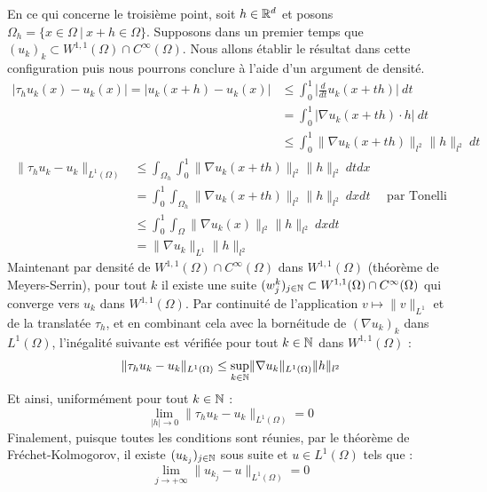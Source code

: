 En ce qui concerne le troisième point, soit $h\in \mathbb{R}^d$ et posons $\Omega_h = \big\{ x \in \Omega \ | \ x + h \in \Omega \big\}$.
Supposons dans un premier temps que $(u_k)_k \subset W^{1,1}(\Omega) \cap C^{\infty}(\Omega)$. Nous allons établir le résultat dans cette configuration puis nous pourrons conclure à l'aide d'un argument de densité.
\begin{equation*}
\begin{split}
    |\tau_h u_k(x) - u_k(x)| = |u_k(x+h) - u_k(x)| &\leq \int_{0}^{1} \Big| \frac{d}{dt}u_k(x+th) \Big| \ dt \\
    &= \int_{0}^{1} \big| \nabla u_k(x+th) \cdot h \big| \ dt \\
    &\leq \int_{0}^{1} \|\nabla u_k(x + th)\|_{l^2}\|h\|_{l^2} \ dt
\end{split}
\end{equation*}
\begin{equation*}
\begin{split}
    \| \tau_h u_k - u_k \|_{L^1(\Omega)} &\leq \int_{\Omega_h} \int_{0}^{1} \|\nabla u_k(x + th)\|_{l^2}\|h\|_{l^2}  \ dt dx \\
    &= \int_{0}^{1} \int_{\Omega_h} \|\nabla u_k(x + th)\|_{l^2}\|h\|_{l^2}  \ dx dt \quad \text{ par Tonelli} \\
    &\leq \int_{0}^{1} \int_{\Omega} \| \nabla u_k(x) \|_{l^2} \|h\|_{l^2} \ dx dt \\
    &= \| \nabla u_k \|_{L^1} \|h\|_{l^2}
\end{split}
\end{equation*}
Maintenant par densité de $W^{1,1}(\Omega) \cap C^{\infty}(\Omega)$ dans $W^{1,1}(\Omega)$ (théorème de Meyers-Serrin), pour tout $k$ il existe une suite $(w^k_j)_{j \in \mathbb{N}} \subset W^{1,1}(\Omega)\cap C^{\infty}(\Omega)$ qui converge vers $u_k$ dans $W^{1,1}(\Omega)$.
Par continuité de l'application $v \mapsto \| v \|_{L^1}$ et de la translatée $\tau_h$, et en combinant cela avec la bornéitude de $(\nabla u_k)_k$ dans $L^1(\Omega)$, l'inégalité suivante est vérifiée pour tout $k\in \mathbb{N}$ dans $W^{1,1}(\Omega)$ :
$$ \| \tau_h u_k - u_k \|_{L^1(\Omega)} \leq \underset{k \in \mathbb{N}}{\sup}\| \nabla u_k \|_{L^1(\Omega)} \|h\|_{l^2} $$
Et ainsi, uniformément pour tout $k \in \mathbb{N}$ :
$$\underset{|h| \to 0}{\lim} \| \tau_h u_k - u_k \|_{L^1(\Omega)} = 0 $$
Finalement, puisque toutes les conditions sont réunies, par le théorème de Fréchet-Kolmogorov, il existe $(u_{k_j})_{j \in \mathbb{N}}$ sous suite et $u \in L^1(\Omega)$ tels que :
$$ \underset{j \to +\infty}{\lim} \| u_{k_j} - u \|_{L^1(\Omega)} = 0 $$



